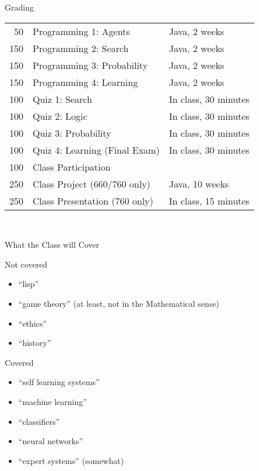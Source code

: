 \documentclass[14pt]{beamer}
\begin{document}
\begin{frame}{Grading}
\begin{tabular}{@{} r l l @{}}
\hline
 50 & Programming 1: Agents & Java, 2 weeks \\
150 & Programming 2: Search & Java, 2 weeks  \\
150 & Programming 3: Probability & Java, 2 weeks  \\
150 & Programming 4: Learning & Java, 2 weeks  \\
\hline
100 & Quiz 1: Search & In class, 30 minutes \\
100 & Quiz 2: Logic & In class, 30 minutes \\
100 & Quiz 3: Probability & In class, 30 minutes \\
100 & Quiz 4: Learning (Final Exam) & In class, 30 minutes \\
\hline
100 & Class Participation \\
\hline
250 & Class Project (\alert{660/760 only}) & Java, 10 weeks \\
250 & Class Presentation (\alert{760 only}) & In class, 15 minutes \\
\hline
\end{tabular}
\end{frame}

\begin{frame}{\ }
\end{frame}


\begin{frame}{What the Class will Cover}
\begin{block}{Not covered}
\begin{itemize}
\item ``lisp''
\item ``game theory'' (at least, not in the Mathematical sense)
\item ``ethics''
\item ``history''
\end{itemize}
\end{block}
\begin{block}{Covered}
\begin{itemize}
\item ``self learning systems''
\item ``machine learning''
\item ``classifiers''
\item ``neural networks''
\item ``expert systems'' (somewhat)
\end{itemize}
\end{block}
\end{frame}
\end{document}
